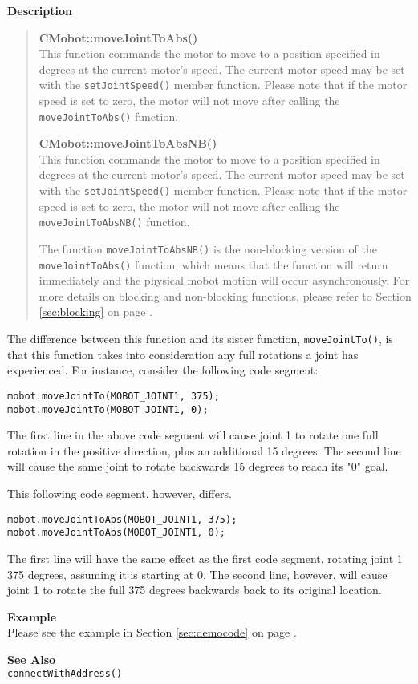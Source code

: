\noindent
{\bf Description}\\
\vspace{-12pt}
\begin{quote}
{\bf CMobot::moveJointToAbs()}\\
This function commands the motor to move to a position specified in degrees at
the current motor's speed. The current motor speed may be set with the
\texttt{setJointSpeed()} member function. Please note that if the motor speed
is set to zero, the motor will not move after calling the
\texttt{moveJointToAbs()} function. 

{\bf CMobot::moveJointToAbsNB()}\\
This function commands the motor to move to a position specified in degrees at
the current motor's speed. The current motor speed may be set with the
\texttt{setJointSpeed()} member function. Please note that if the motor speed
is set to zero, the motor will not move after calling the
\texttt{moveJointToAbsNB()} function. 

The function \texttt{moveJointToAbsNB()} is the non-blocking version of
the \texttt{moveJointToAbs()} function, which means that the function will return
immediately and the physical mobot motion will occur asynchronously. For
more details on blocking and non-blocking functions, please refer to 
Section \ref{sec:blocking} on page \pageref{sec:blocking}.\\
\end{quote}

The difference between this function and its sister function, \texttt{moveJointTo()},
is that this function takes into consideration any full rotations a joint has 
experienced. For instance, consider the following code segment:
\begin{verbatim}
mobot.moveJointTo(MOBOT_JOINT1, 375);
mobot.moveJointTo(MOBOT_JOINT1, 0);
\end{verbatim}
The first line in the above code segment will cause joint 1 to rotate one full
rotation in the positive direction, plus an additional 15 degrees. The second
line will cause the same joint to rotate backwards 15 degrees to reach its "0"
goal.

This following code segment, however, differs.
\begin{verbatim}
mobot.moveJointToAbs(MOBOT_JOINT1, 375);
mobot.moveJointToAbs(MOBOT_JOINT1, 0);
\end{verbatim}
The first line will have the same effect as the first code segment, rotating
joint 1 375 degrees, assuming it is starting at 0. The second line, however,
will cause joint 1 to rotate the full 375 degrees backwards back to its original 
location.

\noindent
{\bf Example}\\
Please see the example in Section \ref{sec:democode} on page \pageref{sec:democode}.\\
\noindent

\noindent
{\bf See Also}\\
\texttt{connectWithAddress()}

